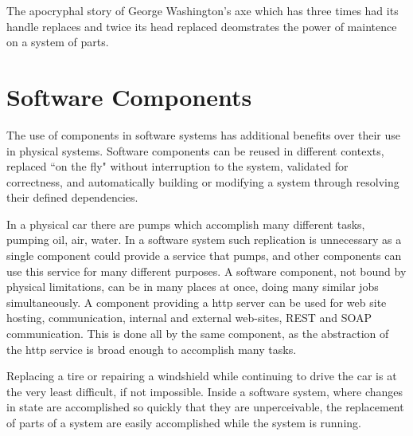 \documentclass{report}
\begin{document}

The apocryphal story of George Washington's axe which has three times had its handle replaces and twice its head replaced deomstrates the power of maintence on a system of parts.


\section{Software Components}
{}The use of components in software systems has additional benefits over their use in physical systems.
{}Software components can be reused in different contexts, replaced ``on the fly" without interruption to the system, validated for correctness, 
{}and automatically building or modifying a system through resolving their defined dependencies.

In a physical car there are pumps which accomplish many different tasks, pumping oil, air, water.
In a software system such replication is unnecessary as a single component could provide a service that pumps, 
and other components can use this service for many different purposes.
A software component, not bound by physical limitations, can be in many places at once, doing many similar jobs simultaneously.
A component providing a http server can be used for web site hosting, communication, internal and external web-sites, REST and SOAP communication.
This is done all by the same component, as the abstraction of the http service is broad enough to accomplish many tasks.

Replacing a tire or repairing a windshield while continuing to drive the car is at the very least difficult, if not impossible.
Inside a software system, where changes in state are accomplished so quickly that they are unperceivable, the replacement of parts of a system are easily accomplished while the system is running.
\end{document}
